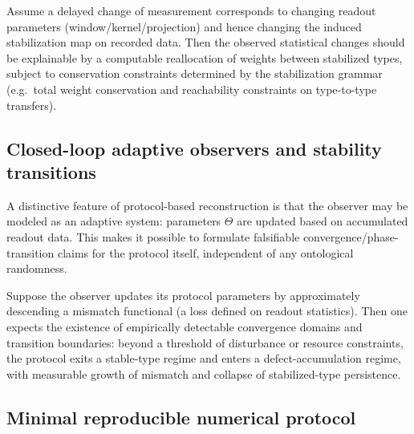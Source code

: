 \begin{proposition}\label{prop:P4}
Assume a delayed change of measurement corresponds to changing readout parameters (window/kernel/projection) and hence changing the induced stabilization map on recorded data. Then the observed statistical changes should be explainable by a computable reallocation of weights between stabilized types, subject to conservation constraints determined by the stabilization grammar (e.g.\ total weight conservation and reachability constraints on type-to-type transfers).
\end{proposition}

\subsection{Closed-loop adaptive observers and stability transitions}\label{sec:falsifiability:adaptive}

A distinctive feature of protocol-based reconstruction is that the observer may be modeled as an adaptive system: parameters $\Theta$ are updated based on accumulated readout data. This makes it possible to formulate falsifiable convergence/phase-transition claims for the protocol itself, independent of any ontological randomness.

\begin{proposition}\label{prop:P5}
Suppose the observer updates its protocol parameters by approximately descending a mismatch functional (a loss defined on readout statistics). Then one expects the existence of empirically detectable convergence domains and transition boundaries: beyond a threshold of disturbance or resource constraints, the protocol exits a stable-type regime and enters a defect-accumulation regime, with measurable growth of mismatch and collapse of stabilized-type persistence.
\end{proposition}

\subsection{Minimal reproducible numerical protocol}\label{sec:falsifiability:protocol}

